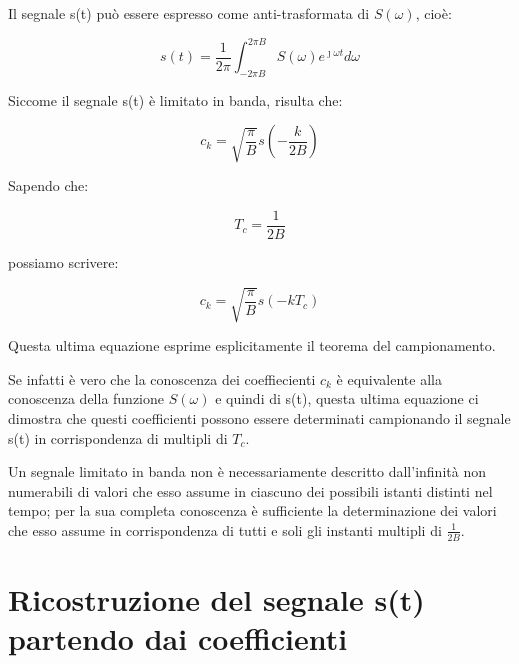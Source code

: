 Il segnale s(t) può essere espresso come anti-trasformata di $S(\omega)$, cioè: 

{
    \Large 
    \begin{equation}
        s(t) 
        = 
        \frac{1}{2 \pi} 
        \int_{-2\pi B}^{2\pi B} 
        S(\omega) e^{\jmath \omega t} 
        d\omega
    \end{equation}
}

Siccome il segnale s(t) è limitato in banda, risulta che: 

{
    \Large 
    \begin{equation}
        c_k 
        = 
        \sqrt{\frac{\pi}{B}}
        s(-\frac{k}{2B})
    \end{equation}
}

Sapendo che: 

{
    \Large 
    \begin{equation}
        T_c 
        = 
        \frac{1}{2B}
    \end{equation}
}

possiamo scrivere: 

{
    \Large 
    \begin{equation}
        c_k = \sqrt{\frac{\pi}{B}} s(-k T_c)
    \end{equation}
}

Questa ultima equazione esprime esplicitamente il teorema del campionamento. \newline 

Se infatti è vero che la conoscenza dei coeffiecienti $c_k$ è equivalente alla conoscenza della funzione 
$S(\omega)$ e quindi di s(t), questa ultima equazione ci dimostra che questi coefficienti possono essere determinati 
campionando il segnale s(t) in corrispondenza di multipli di $T_c$. \newline 

Un segnale limitato in banda non è necessariamente descritto dall'infinità non numerabili di valori 
che esso assume in ciascuno dei possibili istanti distinti nel tempo; 
per la sua completa conoscenza è sufficiente la determinazione dei valori che esso assume in corrispondenza di tutti e soli gli 
instanti multipli di $\frac{1}{2B}$. \newline 

\newpage 

\section{Ricostruzione del segnale s(t) partendo dai coefficienti} 

